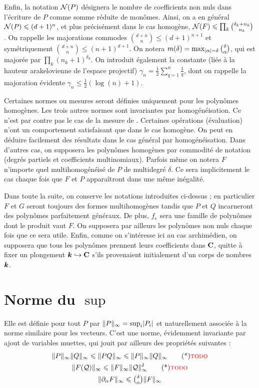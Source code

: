 Enfin, la notation $\mathcal N(P)$ désignera le nombre de coefficients non nuls
dans l'écriture de $P$ comme somme réduite de monômes. Ainsi, on a en général
$\mathcal N(P) \leqslant (d+1)^n$, et plus précisément dans le cas homogène, $\mathcal N(F)
\leqslant \prod\nolimits_k \binom{\delta_k + n_k}{n_k}$. On rappelle les majorations
commodes $\binom{d + n}{n} \le (d + 1)^{n+1}$ et symétriquement $\binom{d +
  n}{n} \le (n + 1)^{d+1}$. On notera $m(\delta) = \max_{\lvert\alpha\rvert = \delta}
{\textstyle \binom\delta\alpha} $, qui est majorée par $\prod\nolimits_k (n_k
+ 1)^{\delta_k}$. On introduit également la constante (liée à la hauteur
arakelovienne de l'espace projectif) $\gamma_n = \frac12 \sum_{q=1}^{n}
\frac1q$, dont on rappelle la majoration évidente $\gamma_n \le \frac12
(\log(n) + 1)$.

Certaines normes ou mesures seront définies uniquement pour les polynômes
homogènes. Les trois autres normes sont invariantes par homogénéisation. Ce
n'est par contre  pas le cas de la mesure de .
Certaines opérations (évaluation) n'ont un comportement satisfaisant que dans
le cas homogène. On peut en déduire facilement des résultats dans le cas
général par homogénéisation. Dans d'autres cas, on supposera les polynômes
homogènes par commodité de notation (degrés partiels et coefficients
multinomiaux). Parfois même on notera $F$ n'importe quel multihomogénéisé de
$P$ de multidegré $\delta$. Ce sera implicitement le cas chaque fois que $F$
et $P$ apparaîtront dans une même inégalité.

Dans toute la suite, on conserve les notations introduites ci-dessus ; en
particulier $F$ et $G$ seront toujours des formes multihomogènes tandis que
$P$ et $Q$ incarneront des polynômes parfaitement généraux. De plus, $f_e$
sera une famille de polynômes dont le produit vaut $F$. On supposera par
ailleurs les polynômes non nuls chaque fois que ce sera utile. Enfin, comme on
s'intéresse ici au cas archimédien, on supposera que tous les polynômes
prennent leurs coefficients dans ${\mathbf{C}}$, quitte à fixer un plongement ${\boldsymbol k}
\hookrightarrow {\mathbf{C}}$ s'ils provenaient initialement d'un corps de nombres
${\boldsymbol k}$.

\section{Norme du \texorpdfstring{$\sup$}{sup}}

Elle est définie pour tout $P$ par $\lVert P\rVert_\infty = \sup_i \lvert P_i\rvert$ et
naturellement associée à la norme similaire pour les vecteurs.  C'est une
norme, évidemment invariante par ajout de variables muettes, qui jouit par
ailleurs des propriétés suivantes :
\begin{gather}
  \normsup P \normsup Q
  \le \normsup {PQ}
  \le \normsup P \normsup Q \todom
  \\
  \normsup {F(\mathcal Q)}
  \le \normsup F \normsup {\mathcal Q}^\delta \todom
  \\
  \normsup {\der\alpha F}
  \le \tbinom\delta\alpha \normsup F
\end{gather}

